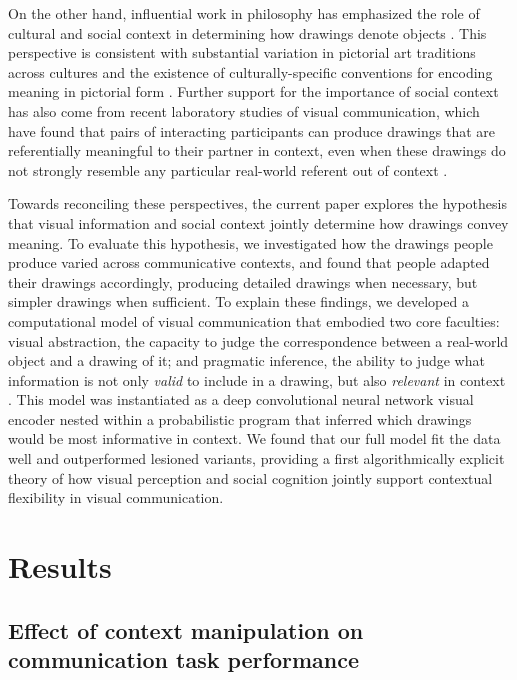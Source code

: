 \documentclass[9pt,twocolumn,twoside]{pnas-new}
\begin{document}
On the other hand, influential work in philosophy has emphasized the role of cultural and social context in determining how drawings denote objects \cite{goodman1976languages}.
This perspective is consistent with substantial variation in pictorial art traditions across cultures \cite{gombrich1989story,gombrich1969art} and the existence of culturally-specific conventions for encoding meaning in pictorial form \cite{boltz1994origin,allen2000middle}. 
Further support for the importance of social context has also come from recent laboratory studies of visual communication, which have found that pairs of interacting participants can produce drawings that are referentially meaningful to their partner in context, even when these drawings do not strongly resemble any particular real-world referent out of context \cite{Garrod:2007wk,fay2010interactive,Galantucci:2005uh}. 

Towards reconciling these perspectives, the current paper explores the hypothesis that visual information and social context jointly determine how drawings convey meaning.
To evaluate this hypothesis, we investigated how the drawings people produce varied across communicative contexts, and found that people adapted their drawings accordingly, producing detailed drawings when necessary, but simpler drawings when sufficient.
To explain these findings, we developed a computational model of visual communication that embodied two core faculties: visual abstraction, the capacity to judge the correspondence between a real-world object and a drawing of it; and pragmatic inference, the ability to judge what information is not only \textit{valid} to include in a drawing, but also \textit{relevant} in context  \cite{goodman2016pragmatic,grice1975syntax,abell2009canny}.
This model was instantiated as a deep convolutional neural network visual encoder nested within a probabilistic program that inferred which drawings would be most informative in context.
We found that our full model fit the data well and outperformed lesioned variants, providing a first algorithmically explicit theory of how visual perception and social cognition jointly support contextual flexibility in visual communication.

\section*{Results}

\subsection*{Effect of context manipulation on communication task performance}
\end{document}
